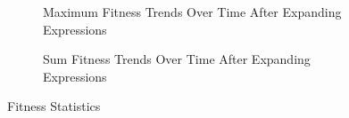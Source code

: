 \begin{figure}[ht]
\begin{subfigure}[t]{0.49\textwidth}
    \caption{Maximum Fitness Trends Over Time After Expanding Expressions}
    \label{img:max_fit}
    \end{subfigure}
    \begin{subfigure}[t]{0.49\textwidth}
    \caption{Sum Fitness Trends Over Time After Expanding Expressions}
    \label{img:fit_sum}
    \end{subfigure}
    \caption{Fitness Statistics}
    \label{img:fitness_stats}  
\end{figure}


